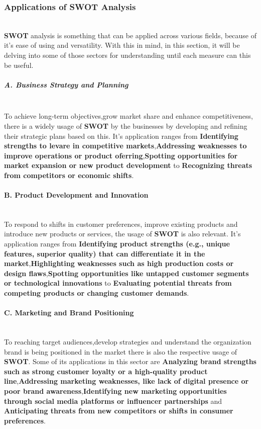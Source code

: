 \subsubsection{Applications of SWOT Analysis}\mbox{}\\
\textbf{SWOT} analysis is something that can be applied across various fields, because of it's ease of using and versatility. With this in mind, in this section, it will be delving into some of those sectors for understanding until each measure can this be useful.
\subparagraph{A. Business Strategy and Planning}\mbox{}\\
To achieve long-term objectives,grow market share and enhance competitiveness, there is a widely usage of \textbf{SWOT} by the businesses by developing and refining their strategic plans based on this. It's application ranges from \textbf{Identifying strengths to levare in competitive markets},\textbf{Addressing weaknesses to improve operations or product oferring},\textbf{Spotting opportunities for market expansion or new product development} to \textbf{Recognizing threats from competitors or economic shifts}.

\paragraph{B. Product Development and Innovation}\mbox{}\\
To respond to shifts in customer preferences, improve existing products and introduce new products or services, the usage of \textbf{SWOT} is also relevant. It's application ranges from \textbf{Identifying product strengths (e.g., unique features, superior quality) that can differentiate it in the market},\textbf{Highlighting weaknesses such as high production costs or design flaws},\textbf{Spotting opportunities like untapped customer segments or technological innovations} to \textbf{Evaluating potential threats from competing products or changing customer demands}.
\paragraph{C. Marketing and Brand Positioning}\mbox{}\\
To reaching target audiences,develop strategies and understand the organization brand is being positioned in the market there is also the respective usage of \textbf{SWOT}. Some of its applications in this sector are \textbf{Analyzing brand strengths such as strong customer loyalty or a high-quality product line},\textbf{Addressing marketing weaknesses, like lack of digital presence or poor brand awareness},\textbf{Identifying new marketing opportunities through social media platforms or influencer partnerships} and \textbf{Anticipating threats from new competitors or shifts in consumer preferences}.
